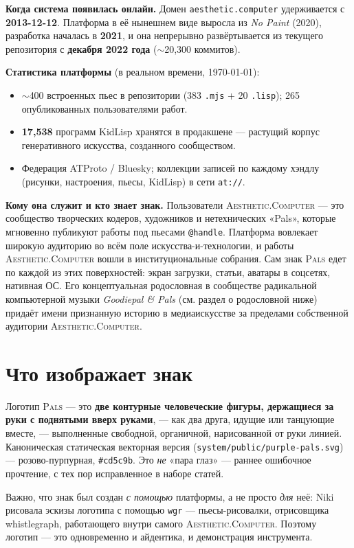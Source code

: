 \documentclass[10pt,letterpaper,twocolumn]{article}
\newcommand{\ac}{\textsc{Aesthetic}{\color{acpink}.}\textsc{Computer}}
\newcommand{\pals}{\textsc{Pals}}
\begin{document}
\textbf{Когда система появилась онлайн.} Домен \texttt{aesthetic.computer}
удерживается с \textbf{2013-12-12}. Платформа в её нынешнем виде выросла из
\emph{No Paint} (2020), разработка началась в \textbf{2021}, и она
непрерывно развёртывается из текущего репозитория с \textbf{декабря 2022
года} ($\sim$20{,}300 коммитов).

\textbf{Статистика платформы} (в реальном времени, \today):
\begin{itemize}
  \item $\sim$400 встроенных пьес в репозитории (383 \texttt{.mjs} + 20
        \texttt{.lisp}); 265 опубликованных пользователями работ.
  \item \textbf{17{,}538} программ KidLisp хранятся в продакшене ---
        растущий корпус генеративного искусства, созданного сообществом.
  \item Федерация ATProto / Bluesky; коллекции записей по каждому хэндлу
        (рисунки, настроения, пьесы, KidLisp) в сети \texttt{at://}.
\end{itemize}

\textbf{Кому она служит и кто знает знак.} Пользователи \ac{} --- это
сообщество творческих кодеров, художников и нетехнических «Pals», которые
мгновенно публикуют работы под пьесами \texttt{@handle}. Платформа
вовлекает широкую аудиторию во всём поле искусства-и-технологии, и работы
\ac{} вошли в институциональные собрания. Сам знак \pals{} едет по каждой
из этих поверхностей: экран загрузки, статьи, аватары в соцсетях, нативная
ОС. Его концептуальная родословная в сообществе радикальной компьютерной
музыки \emph{Goodiepal \& Pals} (см. раздел о родословной ниже) придаёт
имени признанную историю в медиаискусстве за пределами собственной
аудитории \ac{}.

\section{Что изображает знак}

Логотип \pals{} --- это \textbf{две контурные человеческие фигуры,
держащиеся за руки с поднятыми вверх руками}, --- как два друга, идущие
или танцующие вместе, --- выполненные свободной, органичной, нарисованной
от руки линией. Каноническая статическая векторная версия
(\texttt{system/public/purple-pals.svg}) --- розово-пурпурная,
\texttt{\#cd5c9b}. Это \emph{не} «пара глаз» --- раннее ошибочное
прочтение, с тех пор исправленное в наборе статей.

Важно, что знак был создан \emph{с помощью} платформы, а не просто
\emph{для} неё: Niki рисовала эскизы логотипа с помощью \texttt{wgr} ---
пьесы-рисовалки, отрисовщика whistlegraph, работающего внутри самого
\ac{}. Поэтому логотип --- это одновременно и айдентика, и демонстрация
инструмента.
\end{document}
